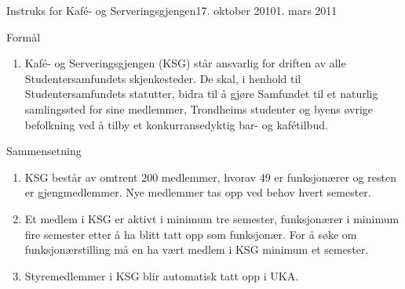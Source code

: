 \begin{instruks}{Instruks for Kaf\'e- og Serveringsgjengen}{17. oktober 2010}{1. mars 2011}

    \begin{instruksledd}{Formål}
        \begin{enumerate}
            \item Kafé- og Serveringsgjengen (KSG) står ansvarlig for driften av alle
                Studentersamfundets skjenkesteder. De skal, i henhold til Studentersamfundets statutter, bidra til å
                gjøre Samfundet til et naturlig samlingssted for sine medlemmer, Trondheims studenter og byens
                øvrige befolkning ved å tilby et konkurransedyktig bar- og kafétilbud.
        \end{enumerate}
    \end{instruksledd}

    \begin{instruksledd}{Sammensetning}
        \begin{enumerate}
            \item KSG består av omtrent 200 medlemmer, hvorav 49 er funksjonærer og resten er
                gjengmedlemmer. Nye medlemmer tas opp ved behov hvert semester.
            \item Et medlem i KSG er aktivt i minimum tre semester, funksjonærer i minimum fire
                semester etter å ha blitt tatt opp som funksjonær. For å søke om funksjonærstilling må en ha vært
                medlem i KSG minimum et semester.
            \item Styremedlemmer i KSG blir automatisk tatt opp i UKA.
        \end{enumerate}
    \end{instruksledd}


\end{instruks}
